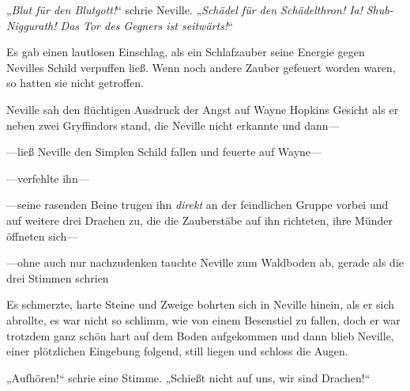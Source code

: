 „\emph{Blut für den Blutgott!}“ schrie Neville. „\emph{Schädel für den Schädelthron! Ia!} \emph{Shub-Niggurath! Das Tor des Gegners ist seitwärts!}“

Es gab einen lautlosen Einschlag, als ein Schlafzauber seine Energie gegen Nevilles Schild verpuffen ließ. Wenn noch andere Zauber gefeuert worden waren, so hatten sie nicht getroffen.

Neville sah den flüchtigen Ausdruck der Angst auf Wayne Hopkins Gesicht als er neben zwei Gryffindors stand, die Neville nicht erkannte und dann—

—ließ Neville den Simplen Schild fallen und feuerte auf Wayne—

—verfehlte ihn—

—seine rasenden Beine trugen ihn \emph{direkt} an der feindlichen Gruppe vorbei und auf weitere drei Drachen zu, die die Zauberstäbe auf ihn richteten, ihre Münder öffneten sich—

—ohne auch nur nachzudenken tauchte Neville zum Waldboden ab, gerade als die drei Stimmen schrien 

Es schmerzte, harte Steine und Zweige bohrten sich in Neville hinein, als er sich abrollte, es war nicht so schlimm, wie von einem Besenstiel zu fallen, doch er war trotzdem ganz schön hart auf dem Boden aufgekommen und dann blieb Neville, einer plötzlichen Eingebung folgend, still liegen und schloss die Augen.

„Aufhören!“ schrie eine Stimme. „Schießt nicht auf uns, wir sind Drachen!“

